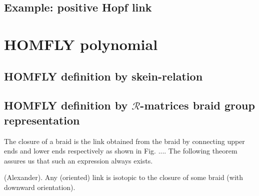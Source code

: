 \documentclass[12pt,a4paper]{article}
\begin{document}
\subsection{Example: positive Hopf link}


\section{HOMFLY polynomial}
\subsection{HOMFLY definition by skein-relation}

\subsection{HOMFLY definition by $\mathcal{R}$-matrices braid group representation}

The closure of a braid is the link obtained from the braid by connecting upper
ends and lower ends respectively as shown in Fig. .... The following theorem
assures us that such an expression always exists.
\begin{tcolorbox}
\begin{theorem}\label{thm:Alexander}
   (Alexander). Any (oriented) link is isotopic to the closure of some
braid (with downward orientation).  
\end{theorem}
\end{tcolorbox} 
\end{document}
